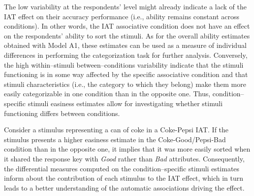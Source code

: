 \documentclass[12pt]{book}
\begin{document}
The low variability at the respondents' level might already indicate a lack of the IAT effect on their accuracy performance (i.e., ability remains constant across conditions). In other words, the IAT associative condition does not have an effect on the respondents' ability to sort the stimuli. As for the overall ability estimates obtained with Model A1, these estimates can be used as a measure of individual differences in performing the categorization task for further analysis.
Conversely, the high within--stimuli between--conditions variability indicate that the stimuli functioning is in some way affected by the specific associative condition and that stimuli characteristics (i.e., the category to which they belong) make them more easily categorizable in one condition than in the opposite one. Thus, condition--specific stimuli easiness estimates allow for investigating whether stimuli functioning differs between conditions. 

Consider a stimulus representing a can of coke in a Coke-Pepsi IAT. If the stimulus presents a higher easiness estimate in the Coke-Good/Pepsi-Bad condition than in the opposite one, it implies that it was more easily sorted when it shared the response key with \emph{Good} rather than \emph{Bad} attributes. Consequently, the differential measures computed on the condition--specific stimuli estimates inform about the contribution of each stimulus to the IAT effect, which in turn leads to a better understanding of the automatic associations driving the effect. 
\end{document}

